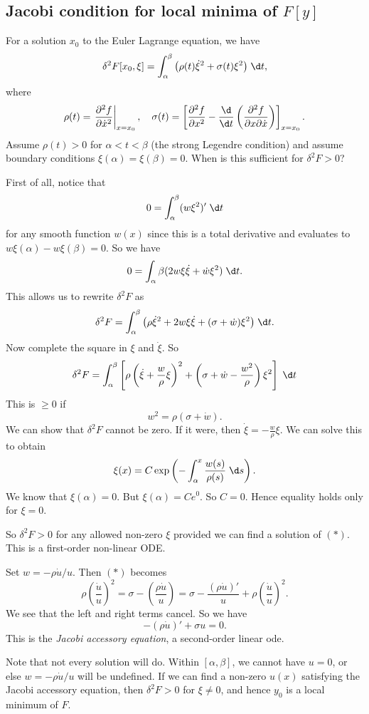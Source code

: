 \documentclass[a4paper]{article}
\begin{document}
\subsection{Jacobi condition for local minima of \texorpdfstring{$F[y]$}{F[y]}}
For a solution $x_0$ to the Euler Lagrange equation, we have
\[
  \delta^2 F[x_0, \xi] = \int_\alpha^\beta \big(\rho(t) \dot{\xi}^2 + \sigma(t) \xi^2\big)\;\d t,
\]
where
\[
  \rho(t) = \left.\frac{\partial^2 f}{\partial \dot{x}^2}\right|_{x = x_0},\quad
  \sigma(t) = \left[\frac{\partial^2 f}{\partial x^2} - \frac{\d}{\d t}\left(\frac{\partial^2 f}{\partial x \partial \dot{x}}\right)\right]_{x = x_0}.
\]
Assume $\rho(t) > 0$ for $\alpha < t < \beta$ (the strong Legendre condition) and assume boundary conditions $\xi(\alpha) = \xi(\beta) = 0$. When is this sufficient for $\delta^2 F > 0$? 

First of all, notice that
\[
  0 = \int_\alpha^\beta (w\xi^2)' \;\d t
\]
for any smooth function $w(x)$ since this is a total derivative and evaluates to $w\xi(\alpha) - w\xi(\beta) = 0$. So we have
\[
  0 = \int_\alpha\beta (2w\xi \dot{\xi} + \dot{w}\xi^2)\;\d t.
\]
This allows us to rewrite $\delta^2 F$ as
\[
  \delta^2 F = \int_\alpha^\beta \big(\rho \dot{\xi}^2 + 2w\xi \dot{\xi} + (\sigma + \dot{w})\xi^2\big)\;\d t.
\]
Now complete the square in $\xi$ and $\dot{\xi}$. So
\[
  \delta^2 F = \int_\alpha^\beta \left[\rho\left(\dot{\xi} + \frac{w}{\rho} \xi\right)^2 +\left(\sigma + \dot{w} - \frac{w^2}{\rho}\right)\xi^2 \right]\;\d t
\]
This is $\geq 0$ if
\[
  w^2 = \rho(\sigma + \dot{w}).\tag{$*$}
\]
We can show that $\delta^2 F$ cannot be zero. If it were, then $\dot{\xi} = -\frac{w}{\rho}\xi$. We can solve this to obtain
\[
  \xi(x) = C\exp\left(-\int_\alpha^x \frac{w(s)}{\rho(s)}\;\d s\right).
\]
We know that $\xi(\alpha) = 0$. But $\xi(\alpha) = C e^0$. So $C = 0$. Hence equality holds only for $\xi = 0$.

So $\delta^2 F > 0$ for any allowed non-zero $\xi$ provided we can find a solution of $(*)$. This is a first-order non-linear ODE.

Set $w = -\rho \dot{u}/u$. Then $(*)$ becomes
\[
  \rho\left(\frac{\dot{u}}{u}\right)^2 = \sigma - \left(\frac{\rho \dot{u}}{u}\right) = \sigma - \frac{(\rho \dot{u})'}{u} + \rho \left(\frac{\dot{u}}{u}\right)^2.
\]
We see that the left and right terms cancel. So we have
\[
  -(\rho \dot{u})' + \sigma u = 0.
\]
This is the \emph{Jacobi accessory equation}, a second-order linear ode.

Note that not every solution will do. Within $[\alpha, \beta]$, we cannot have $u = 0$, or else $w = -\rho \dot{u}/u$ will be undefined. If we can find a non-zero $u(x)$ satisfying the Jacobi accessory equation, then $\delta^2 F > 0$ for $\xi \not= 0$, and hence $y_0$ is a local minimum of $F$.
\end{document}
